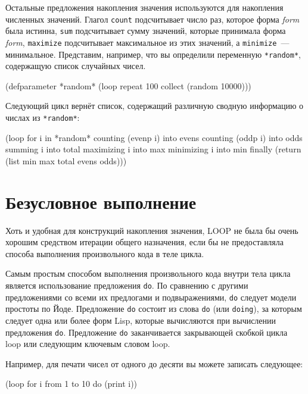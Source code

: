Остальные предложения накопления значения используются для накопления численных
значений. Глагол \lstinline{count} подсчитывает число раз, которое форма \textit{form} была
истинна, \lstinline{sum} подсчитывает сумму значений, которые принимала форма \textit{form},
\lstinline{maximize} подсчитывает максимальное из этих значений, а \lstinline{minimize}~---
минимальное. Представим, например, что вы определили переменную \lstinline{*random*},
содержащую список случайных чисел.

\begin{myverb}
(defparameter *random* (loop repeat 100 collect (random 10000)))
\end{myverb}

Следующий цикл вернёт список, содержащий различную сводную информацию о числах из
\lstinline{*random*}:

\begin{myverb}
(loop for i in *random*
   counting (evenp i) into evens
   counting (oddp i) into odds
   summing i into total
   maximizing i into max
   minimizing i into min
   finally (return (list min max total evens odds)))
\end{myverb}

\section{Безусловное выполнение}

Хоть и удобная для конструкций накопления значения, LOOP не была бы очень хорошим
средством итерации общего назначения, если бы не предоставляла способа выполнения
произвольного кода в теле цикла.

Самым простым способом выполнения произвольного кода внутри тела цикла является
использование предложения \lstinline{do}. По сравнению с другими предложениями со всеми
их предлогами и подвыражениями, \lstinline{do} следует модели простоты по Йоде. Предложение \lstinline{do} состоит из слова \lstinline{do} (или \lstinline{doing}), за которым
следует одна или более форм Lisp, которые вычисляются при вычислении предложения
\lstinline{do}. Предложение \lstinline{do} заканчивается закрывающей скобкой цикла loop или
следующим ключевым словом loop.

Например, для печати чисел от одного до десяти вы можете записать следующее:

\begin{myverb}
(loop for i from 1 to 10 do (print i))
\end{myverb}

